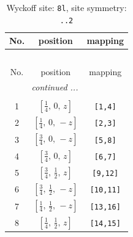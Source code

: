 \documentclass[fleqn,8pt]{jsarticle}
\begin{document}
\begin{longtable}{ccc}
\caption{Wyckoff site: {\tt 8l}, site symmetry: {\tt ..2}}
 \\
 \hline \hline
No. & position & mapping \\ \hline \endfirsthead

\multicolumn{2}{l}{\tablename\ \thetable{}} \\
 \hline \hline
No. & position & mapping \\ \hline \endhead

 \hline \hline
\multicolumn{2}{r}{\footnotesize\it continued ...} \\ \endfoot

 \hline \hline
\multicolumn{2}{r}{} \\ \endlastfoot

1 & $\left[ \frac{1}{4},\, 0,\, z \right]$ & {\tt [1,4]} \\ \hline
2 & $\left[ \frac{1}{4},\, 0,\, - z \right]$ & {\tt [2,3]} \\ \hline
3 & $\left[ \frac{3}{4},\, 0,\, - z \right]$ & {\tt [5,8]} \\ \hline
4 & $\left[ \frac{3}{4},\, 0,\, z \right]$ & {\tt [6,7]} \\ \hline
5 & $\left[ \frac{3}{4},\, \frac{1}{2},\, z \right]$ & {\tt [9,12]} \\ \hline
6 & $\left[ \frac{3}{4},\, \frac{1}{2},\, - z \right]$ & {\tt [10,11]} \\ \hline
7 & $\left[ \frac{1}{4},\, \frac{1}{2},\, - z \right]$ & {\tt [13,16]} \\ \hline
8 & $\left[ \frac{1}{4},\, \frac{1}{2},\, z \right]$ & {\tt [14,15]} \\
\end{longtable}
\renewcommand{\arraystretch}{1.2}
\end{document}
